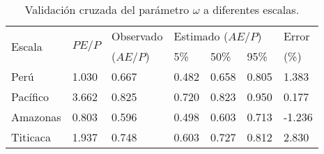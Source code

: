 \begin{table}[!ht]
\caption{Validación cruzada del parámetro $\omega$ a diferentes escalas.}
\label{tab:Table_pbias}
\centering
\begin{tabular}{lllllll}
\hline
\multirow{2}{*}{Escala} & \multirow{2}{*}{$PE/P$} & Observado & \multicolumn{3}{l}{Estimado ($AE/P$)} & Error  \\
                        &                       & ($AE/P$)    & 5\%        & 50\%       & 95\%      & (\%)   \\ \hline
Perú                    & 1.030                 & 0.667     & 0.482      & 0.658      & 0.805     & 1.383  \\
Pacífico                & 3.662                 & 0.825     & 0.720      & 0.823      & 0.950     & 0.177  \\
Amazonas                & 0.803                 & 0.596     & 0.498      & 0.603      & 0.713     & -1.236 \\
Titicaca                & 1.937                 & 0.748     & 0.603      & 0.727      & 0.812     & 2.830  \\ \hline
\end{tabular}
\end{table}
